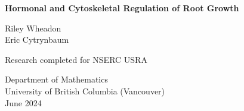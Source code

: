 \begin{titlepage}
    \begin{center}
        \vspace*{1cm}
            
        \Huge
        \textbf{Hormonal and Cytoskeletal Regulation of Root Growth}
            
        \vspace{1.5cm}
        \LARGE
            
        Riley Wheadon \\
				Eric Cytrynbaum
            
        \vfill

				Research completed for NSERC USRA 
            
        \vspace{1.5cm}
            
        \Large
        Department of Mathematics \\
        University of British Columbia (Vancouver) \\
        June 2024
            
    \end{center}
\end{titlepage}
